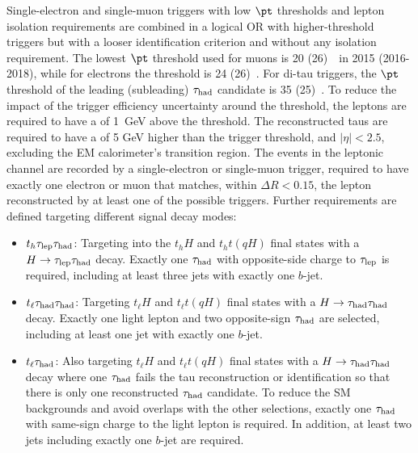 \documentclass[PAPER, coverpage, atlasdraft=true, texlive=2016, UKenglish]{\ATLASLATEXPATH atlasdoc} %
\begin{document}
Single-electron and single-muon triggers with low $\pt$ thresholds and lepton isolation requirements are combined in a logical OR 
with higher-threshold triggers but with a looser identification criterion and without any isolation requirement.
The lowest $\pt$ threshold used for muons is 20 (26)~\gev\ in 2015 (2016-2018), while for electrons the threshold is 24 (26)~\gev.
For di-tau triggers, the $\pt$ threshold of the leading (subleading) $\tau_{\mathrm{had}}$ candidate is 35 (25)~\gev.
To reduce the impact of the trigger efficiency uncertainty around the threshold, the leptons are required to have a \pt of 1~GeV above the threshold. 
The reconstructed taus are required to have a \pt of 5 GeV higher than the trigger threshold, and $|\eta|<2.5$, excluding the EM calorimeter's transition region.
The events in the leptonic channel are recorded by a single-electron or single-muon trigger, required to have exactly one electron or muon that matches, within $\Delta R < 0.15$, the lepton reconstructed by at least one of the possible triggers. Further requirements are defined targeting different signal decay modes:  
\begin{itemize}
\item $t_h\tau_{\mathrm{lep}} \tau_{\mathrm{had}}$: Targeting into the $t_hH$ and $t_ht(qH)$ final states with a $H\to\tau_{\mathrm{lep}} \tau_{\mathrm{had}}$ decay. Exactly one $\tau_{\mathrm{had}}$ with opposite-side charge to $\tau_{\mathrm{lep}}$ is required, including at least three jets with exactly one $b$-jet.
\item $t_{\ell}\tau_{\mathrm{had}} \tau_{\mathrm{had}}$: Targeting $t_{\ell}H$ and $t_{\ell}t(qH)$ final states with a $H\to\tau_{\mathrm{had}} \tau_{\mathrm{had}}$ decay. Exactly one light lepton and two opposite-sign $\tau_{\mathrm{had}}$ are selected, including at least one jet with exactly one $b$-jet.
\item $t_{\ell}\tau_{\mathrm{had}}$: Also targeting $t_{\ell}H$ and $t_{\ell}t(qH)$ final states with a $H\to\tau_{\mathrm{had}} \tau_{\mathrm{had}}$ decay where one $\tau_{\mathrm{had}}$ fails the tau reconstruction or identification so that there is only one reconstructed $\tau_{\mathrm{had}}$ candidate.
  To reduce the SM backgrounds and avoid overlaps with the other selections, exactly one $\tau_{\mathrm{had}}$ with same-sign charge to the light lepton is required.
  In addition, at least two jets including exactly one $b$-jet are required.
\end{itemize}
\end{document}
